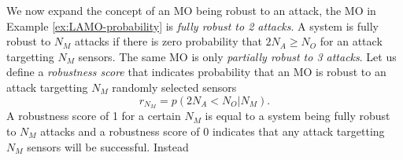 We now expand the concept of an MO being robust to an attack, the MO in Example \ref{ex:LAMO-probability} is \textit{fully robust to 2 attacks}. A system is fully robust to $N_M$ attacks if there is zero probability that $2N_A \geq N_O$ for an attack targetting $N_M$ sensors. The same MO is only \textit{partially robust to 3 attacks}. Let us define a \textit{robustness score} that indicates probability that an MO is robust to an attack targetting $N_M$ randomly selected sensors
\begin{equation}\label{eqn:robustness-score}
    r_{N_M} = p(2N_A < N_O | N_M).
\end{equation}
A robustness score of 1 for a certain $N_M$ is equal to a system being fully robust to $N_M$ attacks and a robustness score of 0 indicates that any attack targetting $N_M$ sensors will be successful. Instead 